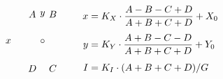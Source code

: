 $
\newgraphescape{b}#1#2#3{
    "z"[#2#3(1.5)]   %
    [l(0.8)]-[r(1.6)] [l(0.8)]-[#2(1.5)] %
    [#2]*{#1} %
}
\vcenter{
\xygraph{
    !{0;<0.7em,0em>:0}
    []="z"
    !bAul !bBur !bCdr !bDdl
    "z"[u(2)l(3)] ="a" "z"[d(2)r(3)] ="c"
        !{ "a"."c"*\frm<1em>{-} }
    "z"*+{\circ} ="o" :[u(4)]*+{y} "o":[l(5)]*+{x}
}
}
\qquad
\begin{aligned}
    x &= K_X \cdot \frac{A-B-C+D}{A+B+C+D} + X_0 \\[0.4em]
    y &= K_Y \cdot \frac{A+B-C-D}{A+B+C+D} + Y_0 \\[0.4em]
    I &= K_I \cdot (A+B+C+D) / G
\end{aligned}
$
